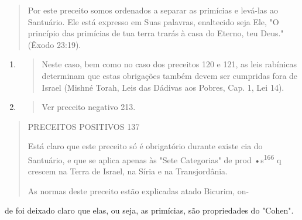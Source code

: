 \begin{quote}
Por este preceito somos ordenados a separar as primícias e levá-las ao
Santuário. Ele está expresso em Suas palavras, enaltecido seja Ele, "O
princí­pio das primícias de tua terra trarás à casa do Eterno, teu
Deus." (Êxodo 23:19).
\end{quote}

\begin{enumerate}
\def\labelenumi{\arabic{enumi}.}
\setcounter{enumi}{163}
\item
  \begin{quote}
  Neste caso, bem como no caso dos preceitos 120 e 121, as leis
  rabínicas determinam que estas obrigações também devem ser cumpridas
  fora de Israel (Mishné Torah, Leis das Dádivas aos Po­bres, Cap. 1,
  Lei 14).
  \end{quote}
\item
  \begin{quote}
  Ver preceito negativo 213.
  \end{quote}
\end{enumerate}

\begin{quote}
PRECEITOS POSITIVOS 137

Está claro que este preceito só é obrigatório durante existe cia do
Santuário, e que se aplica apenas às "Sete Categorias" de prod
•s\textsuperscript{166} q crescem na Ter­ra de Israel, na Síria e na
Transjordânia.

As normas deste preceito estão explicadas atado Bicurim, on-
\end{quote}

de foi deixado claro que elas, ou seja, as primícias, são propriedades
do "Cohen".

